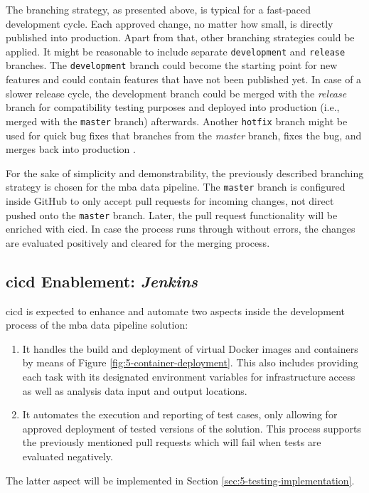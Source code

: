 The branching strategy, as presented above, is typical for a fast-paced development cycle. Each approved change, no matter how small, is directly published into production. Apart from that, other branching strategies could be applied. It might be reasonable to include separate \texttt{development} and \texttt{release} branches. The \texttt{development} branch could become the starting point for new features and could contain features that have not been published yet. In case of a slower release cycle, the development branch could be merged with the \textit{release} branch for compatibility testing purposes and deployed into production (i.e., merged with the \texttt{master} branch) afterwards. Another \texttt{hotfix} branch might be used for quick bug fixes that branches from the \textit{master} branch, fixes the bug, and merges back into production \cite{Driessen2010}.

For the sake of simplicity and demonstrability, the previously described branching strategy is chosen for the \ac{mba} data pipeline. The \texttt{master} branch is configured inside GitHub to only accept pull requests for incoming changes, not direct pushed onto the \texttt{master} branch. Later, the pull request functionality will be enriched with \ac{cicd}. In case the process runs through without errors, the changes are evaluated positively and cleared for the merging process.

\subsection{\acs{cicd} Enablement: \textit{Jenkins}}
\ac{cicd} is expected to enhance and automate two aspects inside the development process of the \ac{mba} data pipeline solution:
\begin{enumerate}
	\item It handles the build and deployment of virtual Docker images and containers by means of Figure \ref{fig:5-container-deployment}. This also includes providing each task with its designated environment variables for infrastructure access as well as analysis data input and output locations.
	\item It automates the execution and reporting of test cases, only allowing for approved deployment of tested versions of the solution. This process supports the previously mentioned pull requests which will fail when tests are evaluated negatively.
\end{enumerate}

The latter aspect will be implemented in Section \ref{sec:5-testing-implementation}.

